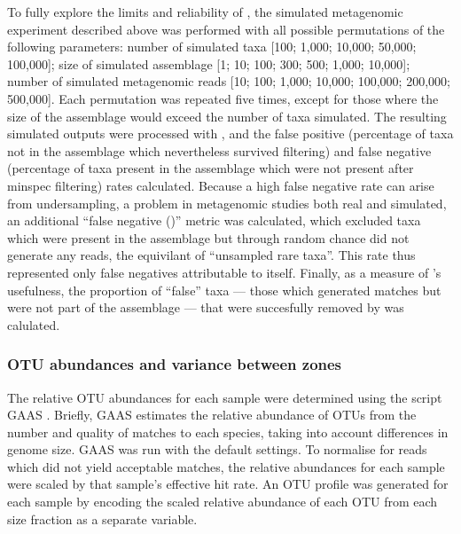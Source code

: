 To fully explore the limits and reliability of , the simulated metagenomic experiment described above was performed with all possible permutations of the following parameters: number of simulated taxa [100; 1,000; 10,000; 50,000; 100,000]; size of simulated assemblage [1; 10; 100; 300; 500; 1,000; 10,000]; number of simulated metagenomic reads [10; 100; 1,000; 10,000; 100,000; 200,000; 500,000].
Each permutation was repeated five times, except for those where the size of the assemblage would exceed the number of taxa simulated.
The resulting simulated  outputs were processed with , and the false positive (percentage of taxa not in the assemblage which nevertheless survived  filtering) and false negative (percentage of taxa present in the assemblage which were not present after minspec filtering) rates calculated.
Because a high false negative rate can arise from undersampling, a problem in metagenomic studies both real and simulated, an additional ``false negative ()'' metric was calculated, which excluded taxa which were present in the assemblage but through random chance did not generate any reads, the equivilant of ``unsampled rare taxa''.
This rate thus represented only false negatives attributable to  itself.
Finally, as a measure of 's usefulness, the proportion of ``false'' taxa --- those which generated  matches but were not part of the assemblage --- that were succesfully removed by  was calulated.

\subsubsection{\ac{OTU} abundances and variance between zones}

The relative \ac{OTU} abundances for each sample were determined using the  script \ac{GAAS} \cite{Angly:2009ip}.
Briefly, \ac{GAAS} estimates the relative abundance of \acp{OTU} from the number and quality of  matches to each species, taking into account differences in genome size. 
\ac{GAAS} was run with the default settings. 
To normalise for reads which did not yield acceptable matches, the relative abundances for each sample were scaled by that sample's effective  hit rate. 
An \ac{OTU} profile was generated for each sample by encoding the scaled relative abundance of each \ac{OTU} from each size fraction as a separate variable.

